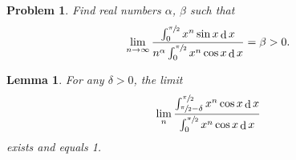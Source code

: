 \documentclass[a4paper, 12pt]{ctexart}
\title{\TITLE}
\author{\AUTHOR}
\date{\today}
\newtheorem{lemma}[theorem]{Lemma}
\theoremstyle{plain}
\newtheorem{problem}{Problem}[section]
\theoremstyle{plain}
\theoremstyle{plain}
\theoremstyle{nonumberplain}
\DeclareMathOperator*{\diff}{d}
\begin{document}

    \maketitle
    \thispagestyle{empty}





    \newpage
    \pagestyle{fancy}
    \linenumbers
    
    \begin{problem}
        Find real numbers $\alpha$, $\beta$ such that
        \begin{equation}
            \lim_{n\to\infty}
            {\frac
            {\int_{0}^{\sfrac{\pi}{2}}{x^{n}\sin{x}\diff x}}
            {n^{\alpha}\int_{0}^{\sfrac{\pi}{2}}{x^{n}\cos{x}\diff x}}
            =\beta > 0}.
        \end{equation}
    \end{problem}

    \begin{lemma}
        For any $\delta >0$, the limit
        \begin{equation}
            \lim_{n}
            {\frac
            {\int_{\sfrac{\pi}{2}-\delta}^{\sfrac{\pi}{2}}{x^{n}\cos{x}\diff x}}
            {\int_{0}^{\sfrac{\pi}{2}}{x^{n}\cos{x}\diff x}}}
        \end{equation}
        exists and equals 1.
    \end{lemma}
\end{document}
